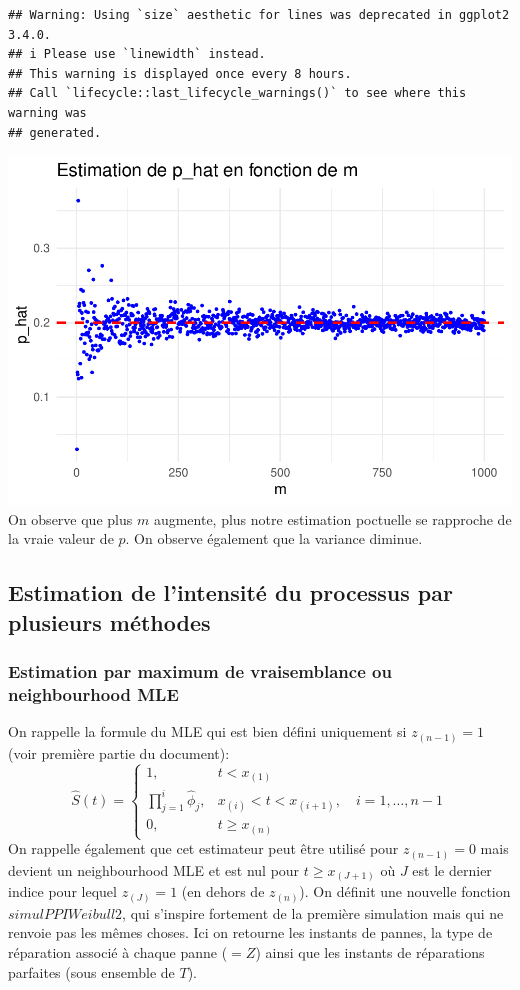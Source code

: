 \documentclass[
]{article}
\begin{document}
\begin{verbatim}
## Warning: Using `size` aesthetic for lines was deprecated in ggplot2 3.4.0.
## i Please use `linewidth` instead.
## This warning is displayed once every 8 hours.
## Call `lifecycle::last_lifecycle_warnings()` to see where this warning was
## generated.
\end{verbatim}

\includegraphics{Projet-Poisson_files/figure-latex/unnamed-chunk-1-1.pdf}
On observe que plus \(m\) augmente, plus notre estimation poctuelle se
rapproche de la vraie valeur de \(p\). On observe également que la
variance diminue.

\subsection{Estimation de l'intensité du processus par plusieurs
méthodes}\label{estimation-de-lintensituxe9-du-processus-par-plusieurs-muxe9thodes}

\subsubsection{Estimation par maximum de vraisemblance ou neighbourhood
MLE}\label{estimation-par-maximum-de-vraisemblance-ou-neighbourhood-mle}

On rappelle la formule du MLE qui est bien défini uniquement si
\(z_{(n-1)}=1\) (voir première partie du document): \[
\hat{S}(t) =
\left\{
\begin{array}{ll}
  1, & t < x_{(1)} \\
  \prod\limits_{j=1}^{i} \hat{\phi}_j, & x_{(i)} < t < x_{(i+1)}, \quad i=1,\dots,n-1 \\
  0, & t \geq x_{(n)}
\end{array}
\right.
\] On rappelle également que cet estimateur peut être utilisé pour
\(z_{(n-1)}=0\) mais devient un neighbourhood MLE et est nul pour
\(t\geq x_{(J+1)}\) où \(J\) est le dernier indice pour lequel
\(z_{(J)}=1\) (en dehors de \(z_{(n)}\)). On définit une nouvelle
fonction \(simulPPIWeibull2\), qui s'inspire fortement de la première
simulation mais qui ne renvoie pas les mêmes choses. Ici on retourne les
instants de pannes, la type de réparation associé à chaque panne
(\(=Z\)) ainsi que les instants de réparations parfaites (sous ensemble
de \(T\)).
\end{document}
